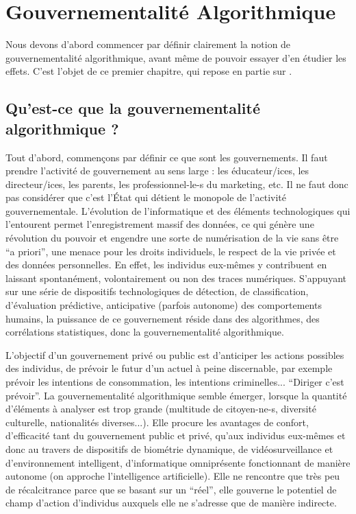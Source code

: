 \documentclass[a4paper,12pt]{report}
\begin{document}
\chapter{Gouvernementalité Algorithmique}

Nous devons d'abord commencer par définir clairement la notion de gouvernementalité algorithmique, avant même de pouvoir essayer d'en étudier les effets. C'est l'objet de ce premier chapitre, qui repose en partie sur \cite{nps}.

\section{Qu'est-ce que la gouvernementalité algorithmique ?}

Tout d'abord, commençons par définir ce que sont les gouvernements. Il faut prendre l'activité de gouvernement au sens large : les éducateur/ices, les directeur/ices, les parents, les professionnel-le-s du marketing, etc. Il ne faut donc pas considérer que c'est l'État qui détient le monopole de l'activité gouvernementale. L'évolution de l'informatique et des éléments technologiques qui l'entourent permet l'enregistrement massif des données, ce qui génère une révolution du pouvoir et engendre une sorte de numérisation de la vie sans être ``a priori'', une menace pour les droits individuels, le respect de la vie privée et des données personnelles. En effet, les individus eux-mêmes y contribuent en laissant spontanément, volontairement ou non des traces numériques. S'appuyant sur une série de dispositifs technologiques de détection, de classification, d'évaluation prédictive, anticipative (parfois autonome) des comportements humains, la puissance de ce gouvernement réside dans des algorithmes, des corrélations statistiques, donc la gouvernementalité algorithmique.

L'objectif d'un gouvernement privé ou public est d'anticiper les actions possibles des individus, de prévoir le futur d'un actuel à peine discernable, par exemple prévoir les intentions de consommation, les intentions criminelles... ``Diriger c'est prévoir''. La gouvernementalité algorithmique semble émerger, lorsque la quantité d'éléments à analyser est trop grande (multitude de citoyen-ne-s, diversité culturelle, nationalités diverses...). Elle procure les avantages de confort, d'efficacité tant du gouvernement public et privé, qu'aux individus eux-mêmes et donc au travers de dispositifs de biométrie dynamique, de vidéosurveillance et d'environnement intelligent, d'informatique omniprésente fonctionnant de manière autonome (on approche l'intelligence artificielle). Elle ne rencontre que très peu de récalcitrance parce que se basant sur un ``réel'', elle gouverne le potentiel de champ d'action d'individus auxquels elle ne s'adresse que de manière indirecte.
\end{document}

